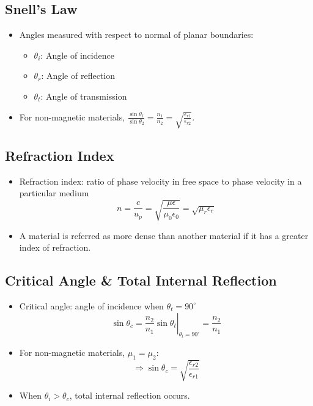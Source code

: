 \documentclass[a4paper]{article}
\begin{document}
\subsection{Snell's Law}
\begin{itemize}
    \item Angles measured with respect to normal of planar boundaries:
    \begin{itemize}[label=$\circ$]
        \item $\theta_i$: Angle of incidence
        \item $\theta_r$: Angle of reflection
        \item $\theta_t$: Angle of transmission
    \end{itemize}
    \begin{center}
    \end{center}
    \item For non-magnetic materials, $\displaystyle\frac{\sin\theta_1}{\sin\theta_2} = \frac{n_1}{n_2} = \sqrt{\frac{\epsilon_{r1}}{\epsilon_{r2}}}$.
\end{itemize}

\newpage
\subsection{Refraction Index}
\begin{itemize}
    \item Refraction index: ratio of phase velocity in free space to phase velocity in a particular medium
    $$n = \frac{c}{u_p} = \sqrt{\frac{\mu\epsilon}{\mu_0\epsilon_0}} = \sqrt{\mu_r\epsilon_r}$$
    \item A material is referred as more dense than another material if it has a greater index of refraction.
\end{itemize}

\subsection{Critical Angle \& Total Internal Reflection}
\begin{itemize}
    \item Critical angle: angle of incidence when $\theta_t=90^\circ$
    $$\sin\theta_c = \left.\frac{n_2}{n_1}\sin\theta_t\right|_{\theta_t = 90^\circ}= \frac{n_2}{n_1}$$
    \item For non-magnetic materials, $\mu_1 = \mu_2$:
    $$\Rightarrow\sin\theta_c = \sqrt{\frac{\epsilon_{r2}}{\epsilon_{r1}}}$$
    \item When $\theta_i>\theta_c$, total internal reflection occurs.
\end{itemize}
\end{document}
